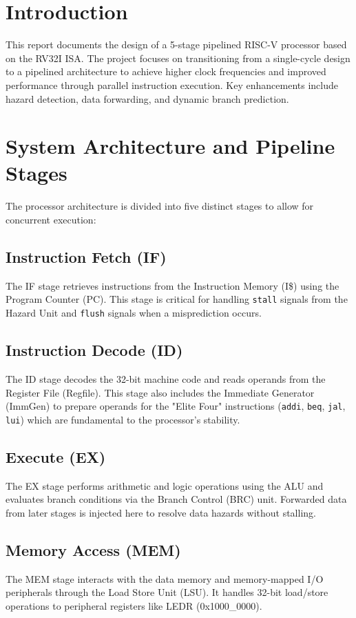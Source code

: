 \section{Introduction}
This report documents the design of a 5-stage pipelined RISC-V processor based on the RV32I ISA. The project focuses on transitioning from a single-cycle design to a pipelined architecture to achieve higher clock frequencies and improved performance through parallel instruction execution. Key enhancements include hazard detection, data forwarding, and dynamic branch prediction.

\newpage
\section{System Architecture and Pipeline Stages}
The processor architecture is divided into five distinct stages to allow for concurrent execution:

\subsection{Instruction Fetch (IF)}
The IF stage retrieves instructions from the Instruction Memory (I\$) using the Program Counter (PC). This stage is critical for handling \texttt{stall} signals from the Hazard Unit and \texttt{flush} signals when a misprediction occurs.

\subsection{Instruction Decode (ID)}
The ID stage decodes the 32-bit machine code and reads operands from the Register File (Regfile). This stage also includes the Immediate Generator (ImmGen) to prepare operands for the "Elite Four" instructions (\texttt{addi}, \texttt{beq}, \texttt{jal}, \texttt{lui}) which are fundamental to the processor's stability.

\subsection{Execute (EX)}
The EX stage performs arithmetic and logic operations using the ALU and evaluates branch conditions via the Branch Control (BRC) unit. Forwarded data from later stages is injected here to resolve data hazards without stalling.

\subsection{Memory Access (MEM)}
The MEM stage interacts with the data memory and memory-mapped I/O peripherals through the Load Store Unit (LSU). It handles 32-bit load/store operations to peripheral registers like LEDR (0x1000\_0000).

